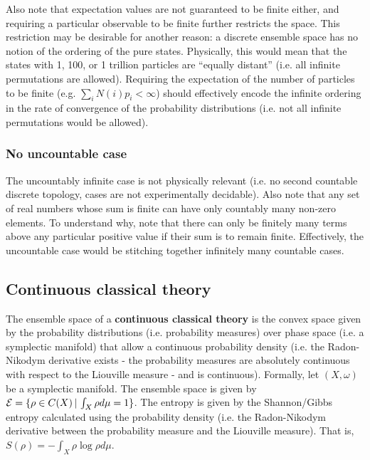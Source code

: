 Also note that expectation values are not guaranteed to be finite either, and requiring a particular observable to be finite further restricts the space. This restriction may be desirable for another reason: a discrete ensemble space has no notion of the ordering of the pure states. Physically, this would mean that the states with 1, 100, or 1 trillion particles are ``equally distant'' (i.e. all infinite permutations are allowed). Requiring the expectation of the number of particles to be finite (e.g. $\sum_i N(i) p_i < \infty$) should effectively encode the infinite ordering in the rate of convergence of the probability distributions (i.e. not all infinite permutations would be allowed).

\subsubsection{No uncountable case}

The uncountably infinite case is not physically relevant (i.e. no second countable discrete topology, cases are not experimentally decidable). Also note that any set of real numbers whose sum is finite can have only countably many non-zero elements. To understand why, note that there can only be finitely many terms above any particular positive value if their sum is to remain finite. Effectively, the uncountable case would be stitching together infinitely many countable cases.

\subsection{Continuous classical theory}

\begin{defn}
	The ensemble space of a \textbf{continuous classical theory} is the convex space given by the probability distributions (i.e. probability measures) over phase space (i.e. a symplectic manifold) that allow a continuous probability density (i.e. the Radon-Nikodym derivative exists - the probability measures are absolutely continuous with respect to the Liouville measure - and is continuous). Formally, let $(X, \omega)$ be a symplectic manifold. The ensemble space is given by $\mathcal{E} = \{ \rho \in C(X) \, | \, \int_X \rho d\mu = 1 \} $. The entropy is given by the Shannon/Gibbs entropy calculated using the probability density (i.e. the Radon-Nikodym derivative between the probability measure and the Liouville measure). That is, $S(\rho) = - \int_X \rho \log \rho d\mu$.
\end{defn}

